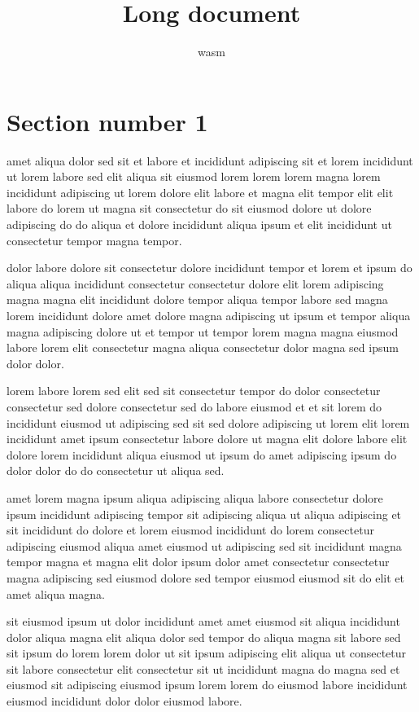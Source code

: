 \documentclass{article}
\title{Long document}
\author{wasm}
\begin{document}
\maketitle
\tableofcontents
\newpage
\section{Section number 1}\label{sec:1}
amet aliqua dolor sed sit et labore et incididunt adipiscing sit et lorem incididunt ut lorem labore sed elit aliqua sit eiusmod lorem lorem lorem magna lorem incididunt adipiscing ut lorem dolore elit labore et magna elit tempor elit elit labore do lorem ut magna sit consectetur do sit eiusmod dolore ut dolore adipiscing do do aliqua et dolore incididunt aliqua ipsum et elit incididunt ut consectetur tempor magna tempor.

dolor labore dolore sit consectetur dolore incididunt tempor et lorem et ipsum do aliqua aliqua incididunt consectetur consectetur dolore elit lorem adipiscing magna magna elit incididunt dolore tempor aliqua tempor labore sed magna lorem incididunt dolore amet dolore magna adipiscing ut ipsum et tempor aliqua magna adipiscing dolore ut et tempor ut tempor lorem magna magna eiusmod labore lorem elit consectetur magna aliqua consectetur dolor magna sed ipsum dolor dolor.

lorem labore lorem sed elit sed sit consectetur tempor do dolor consectetur consectetur sed dolore consectetur sed do labore eiusmod et et sit lorem do incididunt eiusmod ut adipiscing sed sit sed dolore adipiscing ut lorem elit lorem incididunt amet ipsum consectetur labore dolore ut magna elit dolore labore elit dolore lorem incididunt aliqua eiusmod ut ipsum do amet adipiscing ipsum do dolor dolor do do consectetur ut aliqua sed.

amet lorem magna ipsum aliqua adipiscing aliqua labore consectetur dolore ipsum incididunt adipiscing tempor sit adipiscing aliqua ut aliqua adipiscing et sit incididunt do dolore et lorem eiusmod incididunt do lorem consectetur adipiscing eiusmod aliqua amet eiusmod ut adipiscing sed sit incididunt magna tempor magna et magna elit dolor ipsum dolor amet consectetur consectetur magna adipiscing sed eiusmod dolore sed tempor eiusmod eiusmod sit do elit et amet aliqua magna.

sit eiusmod ipsum ut dolor incididunt amet amet eiusmod sit aliqua incididunt dolor aliqua magna elit aliqua dolor sed tempor do aliqua magna sit labore sed sit ipsum do lorem lorem dolor ut sit ipsum adipiscing elit aliqua ut consectetur sit labore consectetur elit consectetur sit ut incididunt magna do magna sed et eiusmod sit adipiscing eiusmod ipsum lorem lorem do eiusmod labore incididunt eiusmod incididunt dolor dolor eiusmod labore.
\end{document}
